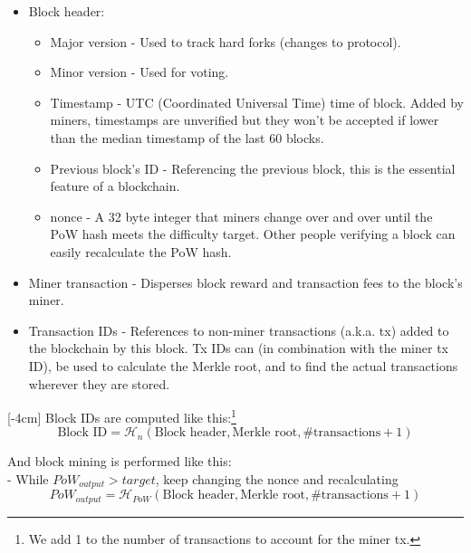 \begin{itemize}
    \item Block header:
    \begin{itemize}
        \item Major version - Used to track hard forks (changes to protocol).
        \item Minor version - Used for voting.
        \item Timestamp - UTC (Coordinated Universal Time) time of block. Added by miners, timestamps are unverified but they won't be accepted if lower than the median timestamp of the last 60 blocks. %
        \item Previous block's ID - Referencing the previous block, this is the essential feature of a blockchain.
        \item nonce - A 32 byte integer that miners change over and over until the PoW hash meets the difficulty target. Other people verifying a block can easily recalculate the PoW hash.
    \end{itemize}
    \item Miner transaction - Disperses block reward and transaction fees to the block's miner.
    \item Transaction IDs - References to non-miner transactions (a.k.a. tx) added to the blockchain by this block. Tx IDs can (in combination with the miner tx ID), be used to calculate the Merkle root, and to find the actual transactions wherever they are stored.
\end{itemize}
[-4cm]
Block IDs are computed like this:\footnote{We add 1 to the number of transactions to account for the miner tx.} %
\[ \textrm{Block ID} = \mathcal{H}_n(\textrm{Block header}, \textrm{Merkle root}, \# \textrm{transactions} + 1) \]

And block mining is performed like this:\\ %
\quad - While ${PoW}_{output} > {target}$, keep changing the nonce and recalculating
\[ {PoW}_{output} = \mathcal{H}_{PoW}(\textrm{Block header}, \textrm{Merkle root}, \# \textrm{transactions} + 1) \]

